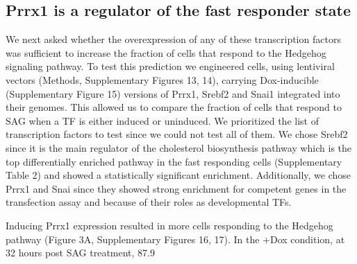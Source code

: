 \subsection{Prrx1 is a regulator of the fast responder state}

We next asked whether the overexpression of any of these transcription factors was sufficient to increase the fraction of cells that respond to the Hedgehog signaling pathway. To test this prediction we engineered cells, using lentiviral vectors (Methods, Supplementary Figures 13, 14), carrying Dox-inducible (Supplementary Figure 15) versions of Prrx1, Srebf2 and Snai1 integrated into their genomes. This allowed us to compare the fraction of cells that respond to SAG when a TF is either induced or uninduced. We prioritized the list of transcription factors to test since we could not test all of them. We chose Srebf2 since it is the main regulator of the cholesterol biosynthesis pathway which is the top differentially enriched pathway in the fast responding cells (Supplementary Table 2) and showed a statistically significant enrichment. Additionally, we chose Prrx1 and Snai since they showed strong enrichment for competent genes in the transfection assay and because of their roles as developmental TFs.

Inducing Prrx1 expression resulted in more cells responding to the Hedgehog pathway (Figure 3A, Supplementary Figures 16, 17). In the +Dox condition, at 32 hours post SAG treatment, 87.9%

